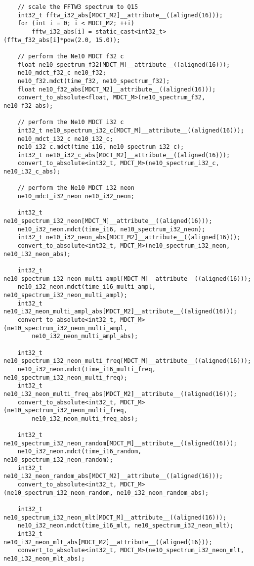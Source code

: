 \documentclass{article}
\begin{document}
\begin{lstlisting}
    // scale the FFTW3 spectrum to Q15
    int32_t fftw_i32_abs[MDCT_M2]__attribute__((aligned(16)));
    for (int i = 0; i < MDCT_M2; ++i)
        fftw_i32_abs[i] = static_cast<int32_t>(fftw_f32_abs[i]*pow(2.0, 15.0));

    // perform the Ne10 MDCT f32 c
    float ne10_spectrum_f32[MDCT_M]__attribute__((aligned(16)));
    ne10_mdct_f32_c ne10_f32;
    ne10_f32.mdct(time_f32, ne10_spectrum_f32);
    float ne10_f32_abs[MDCT_M2]__attribute__((aligned(16)));
    convert_to_absolute<float, MDCT_M>(ne10_spectrum_f32, ne10_f32_abs);

    // perform the Ne10 MDCT i32 c
    int32_t ne10_spectrum_i32_c[MDCT_M]__attribute__((aligned(16)));
    ne10_mdct_i32_c ne10_i32_c;
    ne10_i32_c.mdct(time_i16, ne10_spectrum_i32_c);
    int32_t ne10_i32_c_abs[MDCT_M2]__attribute__((aligned(16)));
    convert_to_absolute<int32_t, MDCT_M>(ne10_spectrum_i32_c, ne10_i32_c_abs);

    // perform the Ne10 MDCT i32 neon
    ne10_mdct_i32_neon ne10_i32_neon;

    int32_t ne10_spectrum_i32_neon[MDCT_M]__attribute__((aligned(16)));
    ne10_i32_neon.mdct(time_i16, ne10_spectrum_i32_neon);
    int32_t ne10_i32_neon_abs[MDCT_M2]__attribute__((aligned(16)));
    convert_to_absolute<int32_t, MDCT_M>(ne10_spectrum_i32_neon, ne10_i32_neon_abs);

    int32_t ne10_spectrum_i32_neon_multi_ampl[MDCT_M]__attribute__((aligned(16)));
    ne10_i32_neon.mdct(time_i16_multi_ampl, ne10_spectrum_i32_neon_multi_ampl);
    int32_t ne10_i32_neon_multi_ampl_abs[MDCT_M2]__attribute__((aligned(16)));
    convert_to_absolute<int32_t, MDCT_M>(ne10_spectrum_i32_neon_multi_ampl,
        ne10_i32_neon_multi_ampl_abs);

    int32_t ne10_spectrum_i32_neon_multi_freq[MDCT_M]__attribute__((aligned(16)));
    ne10_i32_neon.mdct(time_i16_multi_freq, ne10_spectrum_i32_neon_multi_freq);
    int32_t ne10_i32_neon_multi_freq_abs[MDCT_M2]__attribute__((aligned(16)));
    convert_to_absolute<int32_t, MDCT_M>(ne10_spectrum_i32_neon_multi_freq,
        ne10_i32_neon_multi_freq_abs);

    int32_t ne10_spectrum_i32_neon_random[MDCT_M]__attribute__((aligned(16)));
    ne10_i32_neon.mdct(time_i16_random, ne10_spectrum_i32_neon_random);
    int32_t ne10_i32_neon_random_abs[MDCT_M2]__attribute__((aligned(16)));
    convert_to_absolute<int32_t, MDCT_M>(ne10_spectrum_i32_neon_random, ne10_i32_neon_random_abs);

    int32_t ne10_spectrum_i32_neon_mlt[MDCT_M]__attribute__((aligned(16)));
    ne10_i32_neon.mdct(time_i16_mlt, ne10_spectrum_i32_neon_mlt);
    int32_t ne10_i32_neon_mlt_abs[MDCT_M2]__attribute__((aligned(16)));
    convert_to_absolute<int32_t, MDCT_M>(ne10_spectrum_i32_neon_mlt, ne10_i32_neon_mlt_abs);


\end{lstlisting}
\end{document}

